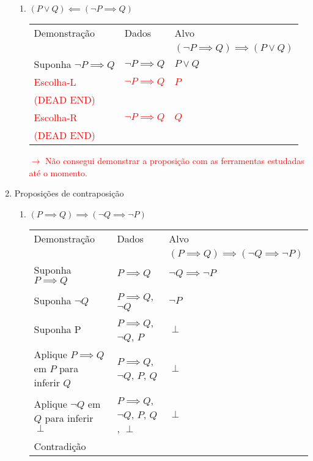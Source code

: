 \documentclass[a4paper, 12pt]{article}
\begin{document}
\begin{enumerate}
\begin{enumerate}[1.]
        \item $(P \lor Q) \impliedby (\neg P \implies Q)$
        \begin{table}[h!]
            \centering
            \begin{tabular}{|p{4cm} | p{4cm} | p{4cm} |}
            \rowcolor{gray!50}
            Demonstração & Dados & Alvo \\
            & & $(\neg P \implies Q) \implies (P \lor Q)$ \\
            Suponha $\neg P \implies Q$ & $\neg P \implies Q$ & $P \lor Q$ \\
            \hline
            \textcolor{red}{Escolha-L} & \textcolor{red}{$\neg P \implies Q$} & \textcolor{red}{$P$}\\
            \textcolor{red}{(DEAD END)} & & \\
            \hline
            \textcolor{red}{Escolha-R} & \textcolor{red}{$\neg P \implies Q$} & \textcolor{red}{$Q$}\\
            \textcolor{red}{(DEAD END)} & & \\
            \hline
            \end{tabular}
        \end{table}

        \textcolor{red}{$\rightarrow$ Não consegui demonstrar a proposição com as ferramentas estudadas até o momento.}
    \end{enumerate}

    \item Proposições de contraposição
    \begin{enumerate}[1.]
        \item $(P \implies Q) \implies (\neg Q \implies \neg P)$
        \begin{table}[h!]
            \centering
            \begin{tabular}{|p{4cm} | p{4cm} | p{4cm} |}
            \rowcolor{gray!50}
            Demonstração & Dados & Alvo \\
            & & $(P \implies Q) \implies (\neg Q \implies \neg P)$ \\
            Suponha $P \implies Q$ & $P \implies Q$ & $\neg Q \implies \neg P$\\
            Suponha $\neg Q$ & $P \implies Q$, $\neg Q$ & $\neg P$\\
            Suponha P & $P \implies Q$, $\neg Q$, $P$ & $\perp$\\
            Aplique $P \implies Q$ em $P$ para inferir $Q$ & $P \implies Q$, $\neg Q$, $P$, $Q$ & $\perp$\\
            Aplique $\neg Q$ em $Q$ para inferir $\perp$ & $P \implies Q$, $\neg Q$, $P$, $Q$, $\perp$ & $\perp$\\
            Contradição & & \\
            \hline
            \end{tabular}
        \end{table}


\end{enumerate}
\end{enumerate}
\end{document}
